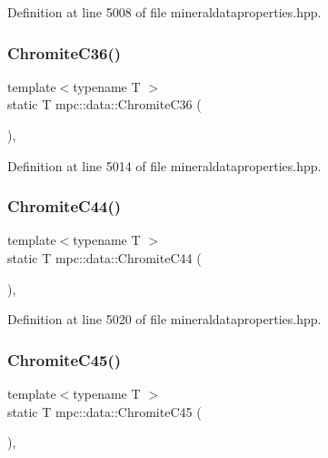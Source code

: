 Definition at line 5008 of file mineraldataproperties.\+hpp.

\mbox{\label{namespacempc_1_1data_adb9aaa7c25dbad6e1b756442a889c57c}} 
\subsubsection{\texorpdfstring{Chromite\+C36()}{ChromiteC36()}}
{\footnotesize\ttfamily template$<$typename T $>$ \\
static T mpc\+::data\+::\+Chromite\+C36 (\begin{DoxyParamCaption}{ }\end{DoxyParamCaption})\hspace{0.3cm}{\ttfamily [inline]}, {\ttfamily [static]}}



Definition at line 5014 of file mineraldataproperties.\+hpp.

\mbox{\label{namespacempc_1_1data_aacd8061639b165b77a2e3523a4b2232a}} 
\subsubsection{\texorpdfstring{Chromite\+C44()}{ChromiteC44()}}
{\footnotesize\ttfamily template$<$typename T $>$ \\
static T mpc\+::data\+::\+Chromite\+C44 (\begin{DoxyParamCaption}{ }\end{DoxyParamCaption})\hspace{0.3cm}{\ttfamily [inline]}, {\ttfamily [static]}}



Definition at line 5020 of file mineraldataproperties.\+hpp.

\mbox{\label{namespacempc_1_1data_a167bae3036ca89864ae4ebb4ba87c721}} 
\subsubsection{\texorpdfstring{Chromite\+C45()}{ChromiteC45()}}
{\footnotesize\ttfamily template$<$typename T $>$ \\
static T mpc\+::data\+::\+Chromite\+C45 (\begin{DoxyParamCaption}{ }\end{DoxyParamCaption})\hspace{0.3cm}{\ttfamily [inline]}, {\ttfamily [static]}}



